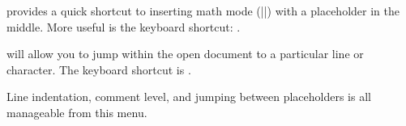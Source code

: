  provides a quick shortcut to inserting math mode (|$ $|) with a placeholder in the middle. More useful is the keyboard shortcut: .

 will allow you to jump within the open document to a particular line or character. The keyboard shortcut is .

Line indentation, comment level, and jumping between placeholders is all manageable from this menu.

%
%

